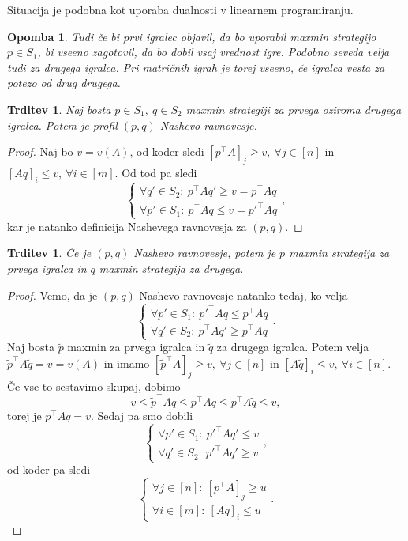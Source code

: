 \documentclass[10pt, a4paper]{article}
\newtheorem{trditev}[izr]{Trditev}
\newtheorem*{opomba}{Opomba}
\newenvironment{noticeC}{%
  \tcolorbox[%
  notitle,
  empty,
  enhanced,  %
  breakable,
  coltext=black, 
  fontupper=\rmfamily,
  noparskip,
  sharp corners,
  boxrule=-1pt,  %
  frame hidden,
  left=7pt,  %
  right=7pt,
  top=5pt,
  bottom=5pt,
  before skip=2.5ex plus 2pt,
  after skip=2.5ex plus 2pt,
  overlay unbroken and last={%
  },
  ]}
{\endtcolorbox}
\newenvironment{dokaz}%
  {\begin{noticeC}\begin{proof}}%
  {\end{proof}\end{noticeC}}
\begin{document}
Situacija je podobna kot uporaba dualnosti v linearnem programiranju.

\begin{opomba}
  Tudi če bi prvi igralec objavil, da bo uporabil maxmin strategijo $p \in S_1$,
  bi vseeno zagotovil, da bo dobil vsaj vrednost igre. Podobno seveda velja tudi za drugega igralca.
  Pri matričnih igrah je torej vseeno, če igralca vesta za potezo od drug drugega.
\end{opomba}

\begin{trditev}
  Naj bosta $p \in S_1,\ q \in S_2$ maxmin strategiji za prvega oziroma drugega igralca.
  Potem je profil $(p, q)$ Nashevo ravnovesje. 
\end{trditev}

\begin{dokaz}
  Naj bo $v = v(A)$, od koder sledi $[p^\top A]_j \geq v,\ \forall j \in [n]$ in 
  $[Aq]_i \leq v,\ \forall i \in [m]$. Od tod pa sledi
  $$\begin{cases}
    \forall q' \in S_2:\ p^\top Aq' \geq v = p^\top A q\\
    \forall p' \in S_1:\ p^\top Aq \leq v = p'^\top A q
  \end{cases},$$
  kar je natanko definicija Nashevega ravnovesja za $(p, q)$.
\end{dokaz}

\begin{trditev}
  Če je $(p, q)$ Nashevo ravnovesje, potem je $p$ maxmin strategija za prvega igralca in $q$ maxmin strategija za drugega.
\end{trditev}

\begin{dokaz}
  Vemo, da je $(p, q)$ Nashevo ravnovesje natanko tedaj, ko velja 
  $$\begin{cases}
    \forall p' \in S_1:\ p'^\top Aq \leq p^\top A q\\
    \forall q' \in S_2:\ p^\top Aq' \geq p^\top A q
  \end{cases}.$$
  Naj bosta $\widetilde{p}$ maxmin za prvega igralca in $\widetilde{q}$
  za drugega igralca. Potem velja $\widetilde{p}^\top A \widetilde{q} = v = v(A)$ in imamo 
  $[\widetilde{p}^\top A]_j \geq v,\ \forall j \in [n]$ in $[A \widetilde{q}]_i \leq v,\ \forall i \in [n]$.
  Če vse to sestavimo skupaj, dobimo 
  $$v \leq \widetilde{p}^\top A q \leq p^\top A q \leq p^\top A \widetilde{q} \leq v,$$
  torej je $p^\top A q = v.$ Sedaj pa smo dobili 
  $$\begin{cases}
    \forall p' \in S_1:\ p'^\top Aq' \leq v\\
    \forall q' \in S_2:\ p'^\top Aq' \geq v
  \end{cases},$$
  od koder pa sledi 
  $$\begin{cases}
    \forall j \in [n]:\ [p^\top A]_j \geq u\\
    \forall i \in [m]:\ [Aq]_i \leq u
  \end{cases}.$$
\end{dokaz}
\end{document}
